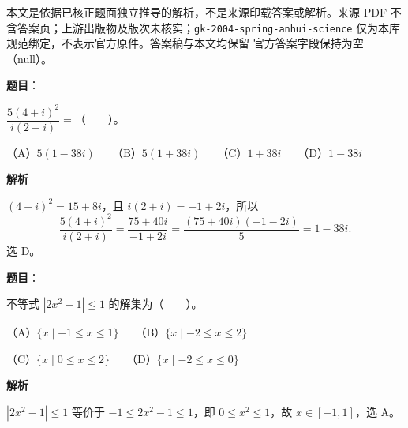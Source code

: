 

\begin{gktip}
本文是依据已核正题面独立推导的解析，不是来源印载答案或解析。来源 PDF 不含答案页；上游出版物及版次未核实；\texttt{gk-2004-spring-anhui-science} 仅为本库规范绑定，不表示官方原件。答案稿与本文均保留 官方答案字段保持为空（null）。
\end{gktip}

\begin{answer}

\textbf{题目}：

$\dfrac{5(4+i)^2}{i(2+i)}=$\mbox{（　　）}。

（A）$5(1-38i)$　　（B）$5(1+38i)$　　（C）$1+38i$　　（D）$1-38i$

\textbf{解析}

$(4+i)^2=15+8i$，且 $i(2+i)=-1+2i$，所以
\nopagebreak[4]
\[
\frac{5(4+i)^2}{i(2+i)}=\frac{75+40i}{-1+2i}
=\frac{(75+40i)(-1-2i)}5=1-38i.
\]
选 D。


\end{answer}
\begin{answer}

\textbf{题目}：

不等式 $|2x^2-1|\leq 1$ 的解集为\mbox{（　　）}。

（A）$\{x\mid -1\leq x\leq 1\}$　　（B）$\{x\mid -2\leq x\leq 2\}$

（C）$\{x\mid 0\leq x\leq 2\}$　　（D）$\{x\mid -2\leq x\leq 0\}$

\textbf{解析}

$|2x^2-1|\le1$ 等价于 $-1\le2x^2-1\le1$，即 $0\le x^2\le1$，故 $x\in[-1,1]$，选 A。


\end{answer}
